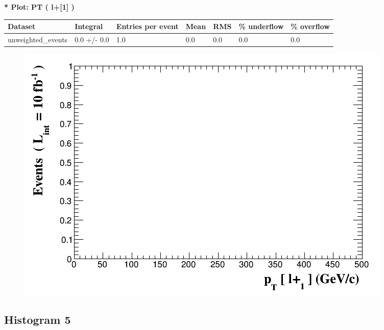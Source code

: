 \documentclass[a4paper, 10pt]{article}
\begin{document}
\textbf{* Plot: PT ( l+[1] ) }\\
   \begin{table}[H]
  \begin{center}
    \begin{tabular}{|m{23.0mm}|m{23.0mm}|m{18.0mm}|m{19.0mm}|m{19.0mm}|m{19.0mm}|m{19.0mm}|}
      \hline
      {\cellcolor{yellow}         Dataset}& {\cellcolor{yellow}         Integral}& {\cellcolor{yellow}         Entries per event}& {\cellcolor{yellow}         Mean}& {\cellcolor{yellow}         RMS}& {\cellcolor{yellow}         \% underflow}& {\cellcolor{yellow}         \% overflow}\\
      \hline
      {\cellcolor{white}         unweighted\_events}& {\cellcolor{white}         0.0 +/\-- 0.0}& {\cellcolor{white}         1.0}& {\cellcolor{white}         0.0}& {\cellcolor{white}         0.0}& {\cellcolor{green}         0.0}& {\cellcolor{green}         0.0}\\
\hline
    \end{tabular}
  \end{center}
\end{table}

\begin{figure}[H]
  \begin{center}
    \includegraphics[scale=0.45]{selection_3.png}\\
\caption{   }
  \end{center}
\end{figure}
      \newpage
\subsection{ Histogram 5}
\end{document}

